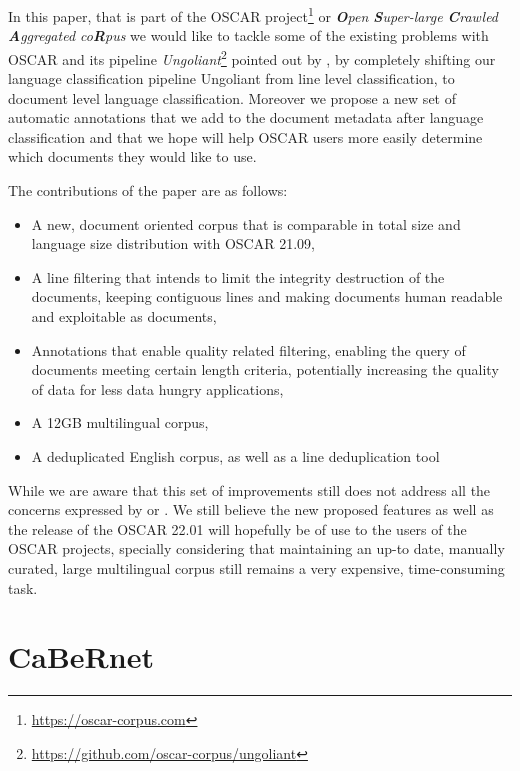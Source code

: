 In this paper, that is part of the OSCAR project\footnote{\url{https://oscar-corpus.com}} or \emph{\textbf{O}pen \textbf{S}uper-large \textbf{C}rawled \textbf{A}ggregated co\textbf{R}pus} \cite{ortiz-suarez-etal-2019-asynchronous,ortiz-suarez-etal-2020-monolingual,abadji-etal-2021-ungoliant} we would like to tackle some of the existing problems with OSCAR and its pipeline \emph{Ungoliant}\footnote{\url{https://github.com/oscar-corpus/ungoliant}} pointed out by , by completely shifting our language classification pipeline Ungoliant from line level classification, to document level language classification. Moreover we propose a new set of automatic annotations that we add to the document metadata after language classification and that we hope will help OSCAR users more easily determine which documents they would like to use.

The contributions of the paper are as follows:

\begin{itemize}
    \item A new, document oriented corpus that is comparable in total size and language size distribution with OSCAR 21.09,
    \item A line filtering that intends to limit the integrity destruction of the documents, keeping contiguous lines and making documents human readable and exploitable as documents,
    \item Annotations that enable quality related filtering, enabling the query of documents meeting certain length criteria, potentially increasing the quality of data for less data hungry applications,
    \item A 12GB multilingual corpus,
    \item A deduplicated English corpus, as well as a line deduplication tool
\end{itemize}

While we are aware that this set of improvements still does not address all the concerns expressed by  or . We still believe the new proposed features as well as the release of the OSCAR 22.01 will hopefully be of use to the users of the OSCAR projects, specially considering that maintaining an up-to date, manually curated, large multilingual corpus still remains a very expensive, time-consuming task.

\section{CaBeRnet}

